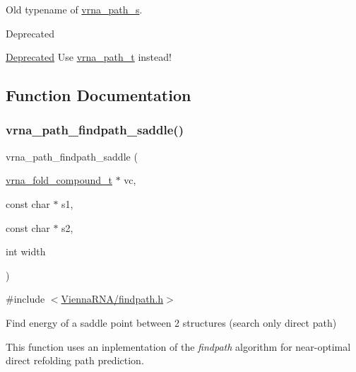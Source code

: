 Old typename of \hyperlink{group__direct__paths_structvrna__path__s}{vrna\+\_\+path\+\_\+s}. 

\begin{DoxyRefDesc}{Deprecated}
\item[\hyperlink{deprecated__deprecated000069}{Deprecated}]Use \hyperlink{group__direct__paths_ga818d4f3d1cf8723d6905990b08d909fe}{vrna\+\_\+path\+\_\+t} instead! \end{DoxyRefDesc}


\subsection{Function Documentation}
\mbox{\label{group__direct__paths_gad611574a76593e26021f177e7854b6b4}} 
\subsubsection{\texorpdfstring{vrna\+\_\+path\+\_\+findpath\+\_\+saddle()}{vrna\_path\_findpath\_saddle()}}
{\footnotesize\ttfamily vrna\+\_\+path\+\_\+findpath\+\_\+saddle (\begin{DoxyParamCaption}\item[{\hyperlink{group__fold__compound_ga1b0cef17fd40466cef5968eaeeff6166}{vrna\+\_\+fold\+\_\+compound\+\_\+t} $\ast$}]{vc,  }\item[{const char $\ast$}]{s1,  }\item[{const char $\ast$}]{s2,  }\item[{int}]{width }\end{DoxyParamCaption})}



{\ttfamily \#include $<$\hyperlink{findpath_8h}{Vienna\+R\+N\+A/findpath.\+h}$>$}



Find energy of a saddle point between 2 structures (search only direct path) 

This function uses an inplementation of the {\itshape findpath} algorithm \cite{flamm:2001} for near-\/optimal direct refolding path prediction.

